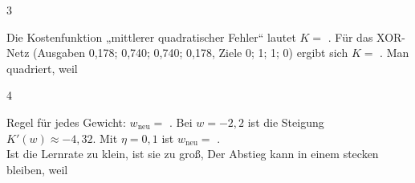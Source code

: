 \documentclass[11pt]{article}
\begin{document}
\begin{aufgabe}{3}
\begin{lueckentext}
Die Kostenfunktion „mittlerer quadratischer Fehler“ lautet $K = $ . Für das XOR-Netz (Ausgaben 0,178; 0,740; 0,740; 0,178, Ziele 0; 1; 1; 0) ergibt sich $K = $ . Man quadriert, weil 
\end{lueckentext}
\end{aufgabe}

\begin{aufgabe}{4}
\begin{lueckentext}
Regel für jedes Gewicht: $w_{\text{neu}} = $ . Bei $w = -2{,}2$ ist die Steigung $K'(w) \approx -4{,}32$. Mit $\eta = 0{,}1$ ist $w_{\text{neu}} = $ .\\
Ist die Lernrate zu klein, 
ist sie zu groß, 
Der Abstieg kann in einem  stecken bleiben, weil 
\end{lueckentext}
\end{aufgabe}
\end{document}
